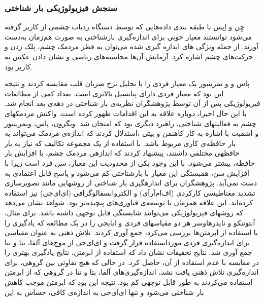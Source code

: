 \subsubsection{سنجش فیزیولوژیکی بار شناختی}
چِن و اِپس
\cite{Chen2013}
با طبقه بندی داده‌هایی که توسط دستگاه ردیاب چشمی از کاربر گرفته‌ می‌شود توانستند معیار خوبی برای اندازه‌گیری بارشناختی به صورت هم‌زمان به‌دست آورند. از جمله ویژگی های اندازه گیری شده می‌توان به قطر‌ مردمک چشم، پلک زدن و حرکت‌های چشم اشاره کرد. آزمایش آن‌ها محاسبه‌‌های ریاضی و نشان دادن عکس به کاربر بود.

پاس و و نمرینبور یک معيار فردی را با تحليل نرخ ضربان قلب مقایسه كردند و نتيجه این بود كه معيار
فردی دارای پتانسيل بالاتری است.  تعداد  كمی از  مطالعات  فيزیولوژیکی پس از آن  توسط پژوهشگران 
نظریه‌ی بار شناختی در دهه‌ی بعد انجام شد. با این حال اخيرا، دوباره علاقه به این اقدامات ظهور كرده 
است.  واكنش  مردمکهای چشم
به فعاليتهای شناختی، راهبرد دیگری بود  كه  امتحان شد.
\cite{paas1994variability}
ونگرون،  پاس، ونمرینبور و  اشميت با اشاره به  كار كاهنمن و بيتی
\cite{kahneman1966pupil}
،استدلال كردند كه  اندازه‌ی
مردمک  می‌تواند به  بار  حافظه‌ی كاری مربوط  باشد.  با  استفاده  از یک مجموعه تکاليف كه  نياز به  بار 
حافظهی مختلفی داشتند،  پيشنهاد كردند  كه  اندازهی مردمک  چشم،  با  افزایش بار حافظه، بيشتر
می‌شود. با این وجود یکی از محدودیت این معيار، سن فرد است زیرا با افزایش سن، همبستگی این معيار
با بارشناختی كم می‌شود و پاسخ قابل اعتمادی به دست نمی‌آید.
\cite{van2004memory}
پژوهشگران برای اندازهگيری بار شناختی از روشهایی مانند تصویرسازی تشدید مغناطيسی كاركردی
(اف‌ام‌آرآی)
و الکتروانسفالوگرافی (ای‌ای‌جی) نيز استفاده  كرده‌اند.  این علاقه  همزمان  با  توسعه‌ی
فناوری‌های پيچيده‌تر بود.  شواهد نشان می‌دهد كه  روشهای فيزیولوژیکی می‌توانند شایستگی قابل
توجهی داشته باشد.
\cite{sweller2011measuring}
برای مثال، آنتوننکو و نایدرهاوسر هر دو مقياسهای فردی و ایایجی را در یک
مطالعه كه یادگيری را با استفاده از ابرمتن‌ها بررسی می‌كرد، جمع آوری كردند. تلاش ذهنی به عنوان 
مقياسی برای اندازه‌گيری فردی مورداستفاده قرار گرفت و ای‌ای‌جی از موج‌های آلفا، بتا و تتا جمع آوری شد. نتایج تحقيقات نشان داد كه استفاده از ابرمتن، نتایج یادگيری بهتری را در مقایسه با عدم استفاده از 
آن،  حاصل  كرد.  در حالی كه هيچ تفاوتی بين گروهی، برای اندازه‌گيری تلاش  ذهنی یافت نشد،
اندازه‌گيری‌های آلفا، بتا و تتا در گروهی كه از ابرمتن استفاده می‌كردند به طور قابل توجهی كم بود. نتيجه
این بود كه ابرمتن موجب كاهش بار شناختی می‌شود و تنها ای‌ای‌جی به اندازه‌ی كافی، حساس به این
